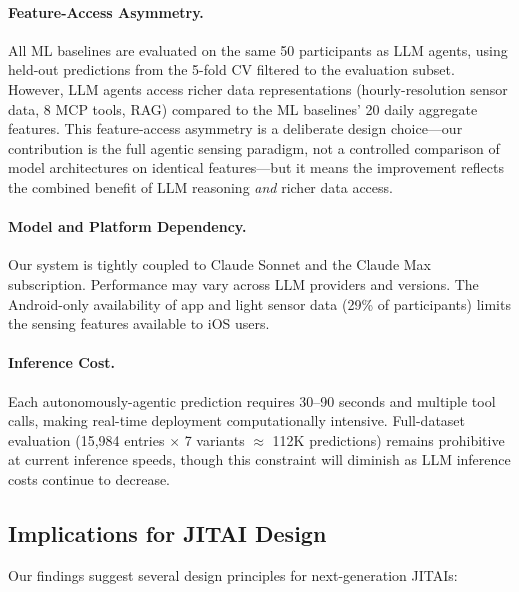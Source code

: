 \documentclass[screen,review,anonymous]{acmart}
\begin{document}
\paragraph{Feature-Access Asymmetry.}
All ML baselines are evaluated on the same 50 participants as LLM agents, using held-out predictions from the 5-fold CV filtered to the evaluation subset. However, LLM agents access richer data representations (hourly-resolution sensor data, 8 MCP tools, RAG) compared to the ML baselines' 20 daily aggregate features. This feature-access asymmetry is a deliberate design choice---our contribution is the full agentic sensing paradigm, not a controlled comparison of model architectures on identical features---but it means the improvement reflects the combined benefit of LLM reasoning \emph{and} richer data access.

\paragraph{Model and Platform Dependency.}
Our system is tightly coupled to Claude Sonnet and the Claude Max subscription. Performance may vary across LLM providers and versions. The Android-only availability of app and light sensor data (29\% of participants) limits the sensing features available to iOS users.

\paragraph{Inference Cost.}
Each autonomously-agentic prediction requires 30--90 seconds and multiple tool calls, making real-time deployment computationally intensive. Full-dataset evaluation (15,984 entries $\times$ 7 variants $\approx$ 112K predictions) remains prohibitive at current inference speeds, though this constraint will diminish as LLM inference costs continue to decrease.

\subsection{Implications for JITAI Design}

Our findings suggest several design principles for next-generation JITAIs:
\end{document}
